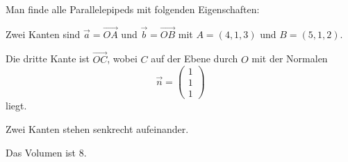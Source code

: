 \begin{beispiel}
Man finde alle Parallelepipeds mit folgenden Eigenschaften:
\begin{compactenum}
\item Zwei Kanten sind $\vec a=\overrightarrow{OA}$ und $\vec b=\overrightarrow{OB}$ 
mit $A=(4,1,3)$ und $B=(5,1,2)$.
\item Die dritte Kante ist $\overrightarrow{OC}$, wobei $C$ auf der
Ebene durch $O$ mit der Normalen 
\[
\vec n=\begin{pmatrix}1\\1\\1\end{pmatrix}
\]
liegt.
\item Zwei Kanten stehen senkrecht aufeinander.
\item Das Volumen ist $8$.
\end{compactenum}

\smallskip


\end{beispiel}
